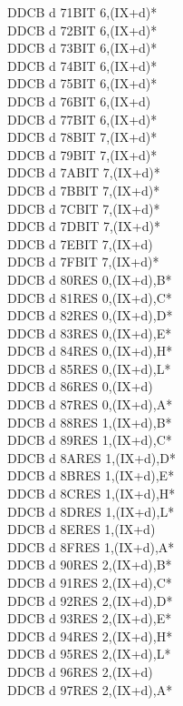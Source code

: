 \documentclass[oneside,a4paper]{book}
\begin{document}
\begin{multicols}{3}
{\begin{tabbing}
DDCB d 71\>BIT 6,(IX+d)*\\
DDCB d 72\>BIT 6,(IX+d)*\\
DDCB d 73\>BIT 6,(IX+d)*\\
DDCB d 74\>BIT 6,(IX+d)*\\
DDCB d 75\>BIT 6,(IX+d)*\\
DDCB d 76\>BIT 6,(IX+d)\\
DDCB d 77\>BIT 6,(IX+d)*\\
DDCB d 78\>BIT 7,(IX+d)*\\
DDCB d 79\>BIT 7,(IX+d)*\\
DDCB d 7A\>BIT 7,(IX+d)*\\
DDCB d 7B\>BIT 7,(IX+d)*\\
DDCB d 7C\>BIT 7,(IX+d)*\\
DDCB d 7D\>BIT 7,(IX+d)*\\
DDCB d 7E\>BIT 7,(IX+d)\\
DDCB d 7F\>BIT 7,(IX+d)*\\
DDCB d 80\>RES 0,(IX+d),B*\\
DDCB d 81\>RES 0,(IX+d),C*\\
DDCB d 82\>RES 0,(IX+d),D*\\
DDCB d 83\>RES 0,(IX+d),E*\\
DDCB d 84\>RES 0,(IX+d),H*\\
DDCB d 85\>RES 0,(IX+d),L*\\
DDCB d 86\>RES 0,(IX+d)\\
DDCB d 87\>RES 0,(IX+d),A*\\
DDCB d 88\>RES 1,(IX+d),B*\\
DDCB d 89\>RES 1,(IX+d),C*\\
DDCB d 8A\>RES 1,(IX+d),D*\\
DDCB d 8B\>RES 1,(IX+d),E*\\
DDCB d 8C\>RES 1,(IX+d),H*\\
DDCB d 8D\>RES 1,(IX+d),L*\\
DDCB d 8E\>RES 1,(IX+d)\\
DDCB d 8F\>RES 1,(IX+d),A*\\
DDCB d 90\>RES 2,(IX+d),B*\\
DDCB d 91\>RES 2,(IX+d),C*\\
DDCB d 92\>RES 2,(IX+d),D*\\
DDCB d 93\>RES 2,(IX+d),E*\\
DDCB d 94\>RES 2,(IX+d),H*\\
DDCB d 95\>RES 2,(IX+d),L*\\
DDCB d 96\>RES 2,(IX+d)\\
DDCB d 97\>RES 2,(IX+d),A*\\

\end{tabbing}}
\end{multicols}
\end{document}
